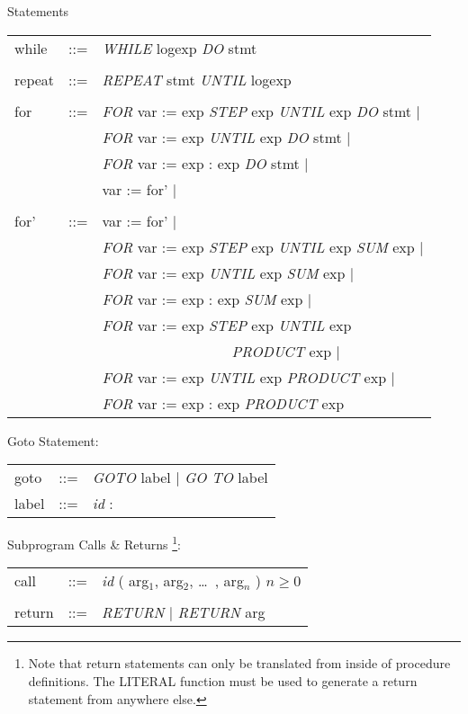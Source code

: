 \begin{describe}{Statements}
\begin{tabular}{lll} 
while & ::= & {\it WHILE\/} logexp {\it DO\/} stmt\\
& &\\
repeat & ::= & {\it REPEAT\/} stmt {\it UNTIL\/} logexp\\
& &\\
for & ::= & {\it FOR\/} var := exp {\it STEP\/} exp {\it UNTIL\/} exp
{\it DO\/} stmt $\mid$\\
& &{\it FOR\/} var := exp {\it UNTIL\/} exp {\it DO\/} stmt $\mid$\\
& &{\it FOR\/} var := exp : exp {\it DO\/} stmt $\mid$\\
& &var := for' $\mid$ \\
& &\\
for' & ::= & var := for' $\mid$\\
& &{\it FOR\/} var := exp {\it STEP\/} exp {\it UNTIL\/} exp {\it SUM\/} exp
 $\mid$\\
& &{\it FOR\/} var := exp {\it UNTIL\/} exp {\it SUM\/} exp $\mid$\\
& &{\it FOR\/} var := exp : exp {\it SUM\/} exp $\mid$\\
& &{\it FOR\/} var := exp {\it STEP\/} exp {\it UNTIL\/} exp\\
& & \ \ \ \ \ \ \ \ \ \ \ \ \ \ \ \ \ \ {\it PRODUCT\/} exp $\mid$ \\
& &{\it FOR\/} var := exp {\it UNTIL\/} exp {\it PRODUCT\/} exp $\mid$\\
& &{\it FOR\/} var := exp : exp {\it PRODUCT\/} exp\\
\end{tabular}

Goto Statement:

\begin{tabular}{lll}
goto & ::= & {\it GOTO\/} label  $\mid$ {\it GO TO\/} label\\
label & ::= & {\it id\/} :\\
\end{tabular}

Subprogram Calls \& Returns \footnote{ Note that return statements can
only be translated from inside of procedure definitions.
 The LITERAL function must be used to generate
a return statement from anywhere else.}:

\begin{tabular}{lll}
call & ::= & {\it id\/} ( arg$_1$, arg$_2$, \dots\ , arg$_n$ ) $n \geq 0$\\
& &\\
return & ::= & {\it RETURN\/} $\mid$ {\it RETURN\/} arg\\
\end{tabular}


\end{describe}
